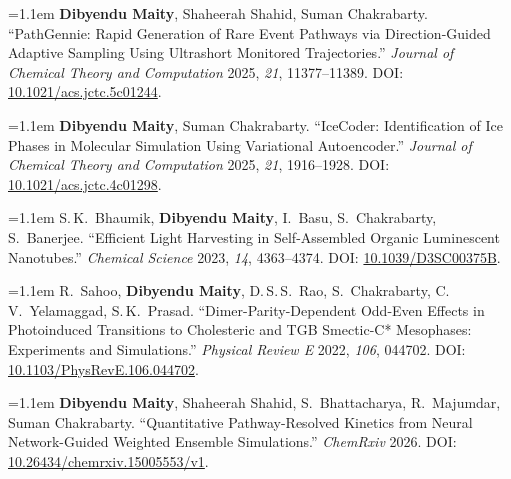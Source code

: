 \documentclass[10pt,a4paper]{article}
\newcommand{\pubentry}[1]{%
  \par\noindent\hangindent=1.1em\hangafter=1 #1\par\vspace{5pt}%
}
\newcommand{\me}{\textbf{Dibyendu Maity}}
\begin{document}
\pubentry{\me, Shaheerah Shahid, Suman Chakrabarty. ``PathGennie: Rapid Generation of Rare Event
  Pathways via Direction-Guided Adaptive Sampling Using Ultrashort Monitored Trajectories.''
  \textit{Journal of Chemical Theory and Computation} 2025, \textit{21}, 11377--11389.
  DOI: \href{https://doi.org/10.1021/acs.jctc.5c01244}{10.1021/acs.jctc.5c01244}.}

\pubentry{\me, Suman Chakrabarty. ``IceCoder: Identification of Ice Phases in Molecular
  Simulation Using Variational Autoencoder.'' \textit{Journal of Chemical Theory and Computation}
  2025, \textit{21}, 1916--1928.
  DOI: \href{https://doi.org/10.1021/acs.jctc.4c01298}{10.1021/acs.jctc.4c01298}.}

\pubentry{S.\,K.\ Bhaumik, \me, I.\ Basu, S.\ Chakrabarty, S.\ Banerjee. ``Efficient Light
  Harvesting in Self-Assembled Organic Luminescent Nanotubes.'' \textit{Chemical Science} 2023,
  \textit{14}, 4363--4374.
  DOI: \href{https://doi.org/10.1039/D3SC00375B}{10.1039/D3SC00375B}.}

\pubentry{R.\ Sahoo, \me, D.\,S.\,S.\ Rao, S.\ Chakrabarty, C.\,V.\ Yelamaggad, S.\,K.\ Prasad.
  ``Dimer-Parity-Dependent Odd-Even Effects in Photoinduced Transitions to Cholesteric and TGB
  Smectic-C* Mesophases: Experiments and Simulations.'' \textit{Physical Review E} 2022,
  \textit{106}, 044702.
  DOI: \href{https://doi.org/10.1103/PhysRevE.106.044702}{10.1103/PhysRevE.106.044702}.}


\pubentry{\me, Shaheerah Shahid, S.\ Bhattacharya, R.\ Majumdar, Suman Chakrabarty.
  ``Quantitative Pathway-Resolved Kinetics from Neural Network-Guided Weighted Ensemble
  Simulations.'' \textit{ChemRxiv} 2026.
  DOI: \href{https://doi.org/10.26434/chemrxiv.15005553/v1}{10.26434/chemrxiv.15005553/v1}.}


\end{document}

